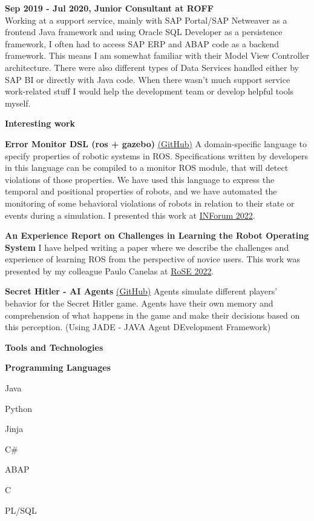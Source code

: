 \documentclass[a4paper,12pt,final]{memoir}
\newcommand{\Sep}{\vspace{1.5em}}
\newcommand{\SmallSep}{\vspace{0.5em}}
\newcommand{\CVSection}[1]
	{\Large\textbf{#1}\par
	\SmallSep\normalsize\normalfont}
\newcommand{\CVItem}[1]
	{\textbf{\color{RoyalBlue} #1}}
\begin{document}
\CVItem{Sep 2019 - Jul 2020, Junior Consultant at ROFF}\\
Working at a support service, mainly with SAP Portal/SAP Netweaver as a frontend Java framework and using Oracle SQL Developer as a persistence framework, I often had to access SAP ERP and ABAP code as a backend framework. This means I am somewhat familiar with their Model View Controller architecture. There were also different types of Data Services handled either by SAP BI or directly with Java code. When there wasn't much support service work-related stuff I would help the development team or develop helpful tools myself.


\clearpage
\framebreak
\framebreak

\CVSection{Interesting work}

\CVItem{Error Monitor DSL (ros + gazebo)}
\href{https://github.com/ricardocajo/error-monitor-ros-gazebo}{(GitHub)} 
A domain-specific language to specify properties of robotic systems in ROS. Specifications written by developers in this language can be compiled to a monitor ROS module, that will detect violations of those properties. We have used this language to express the temporal and positional properties of robots, and we have automated the monitoring of some behavioral violations of robots in relation to their state or events during a simulation.
I presented this work at \href{https://inforum.org.pt/}{INForum 2022}.
\SmallSep

\CVItem{An Experience Report on Challenges in Learning the Robot Operating System}
I have helped writing a paper where we describe the challenges and experience of learning ROS from the perspective of novice users. This work was presented by my colleague Paulo Canelas at \href{https://rose-workshops.github.io/rose2022/}{RoSE 2022}.
\SmallSep

\CVItem{Secret Hitler - AI Agents}
\href{https://github.com/Tiagofvarela/Sistemas-Multi-Agente}{(GitHub)}
Agents simulate different players' behavior for the Secret Hitler game. Agents have their own memory and comprehension of what happens in the game and make their decisions based on this perception. (Using JADE - JAVA Agent DEvelopment Framework)
\SmallSep

\Sep

\CVSection{Tools and Technologies}
\CVItem{Programming Languages}
\begin{multicols}{3}
\begin{compactitem}[\color{RoyalBlue}$\circ$]
	\item Java 
	\item Python
	\item Jinja
	\item C\#
	\item ABAP
	\item C
    \item PL/SQL
\end{compactitem}
\end{multicols}
\SmallSep
\end{document}
